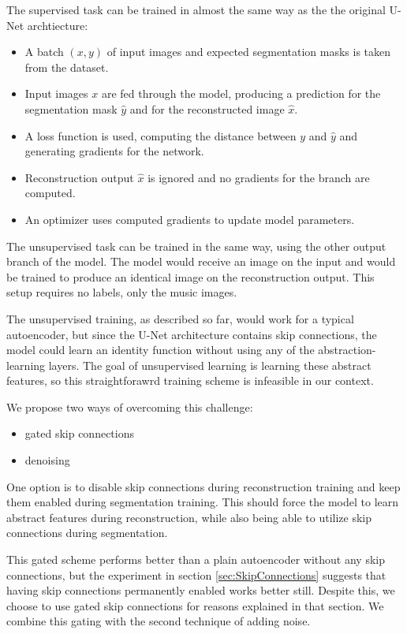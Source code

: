 The supervised task can be trained in almost the same way as the the original U-Net archtiecture:

\begin{itemize}
    \item A batch $(x, y)$ of input images and expected segmentation masks is taken from the dataset.
    \item Input images $x$ are fed through the model, producing a prediction for the segmentation mask $\hat{y}$ and for the reconstructed image $\hat{x}$.
    \item A loss function is used, computing the distance between $y$ and $\hat{y}$ and generating gradients for the network.
    \item Reconstruction output $\hat{x}$ is ignored and no gradients for the branch are computed.
    \item An optimizer uses computed gradients to update model parameters.
\end{itemize}

The unsupervised task can be trained in the same way, using the other output branch of the model. The model would receive an image on the input and would be trained to produce an identical image on the reconstruction output. This setup requires no labels, only the music images.

The unsupervised training, as described so far, would work for a typical autoencoder, but since the U-Net architecture contains skip connections, the model could learn an identity function without using any of the abstraction-learning layers. The goal of unsupervised learning is learning these abstract features, so this straightforawrd training scheme is infeasible in our context.

We propose two ways of overcoming this challenge:

\begin{itemize}
    \item gated skip connections
    \item denoising
\end{itemize}

One option is to disable skip connections during reconstruction training and keep them enabled during segmentation training. This should force the model to learn abstract features during reconstruction, while also being able to utilize skip connections during segmentation.

This gated scheme performs better than a plain autoencoder without any skip connections, but the experiment in section \ref{sec:SkipConnections} suggests that having skip connections permanently enabled works better still. Despite this, we choose to use gated skip connections for reasons explained in that section. We combine this gating with the second technique of adding noise.


